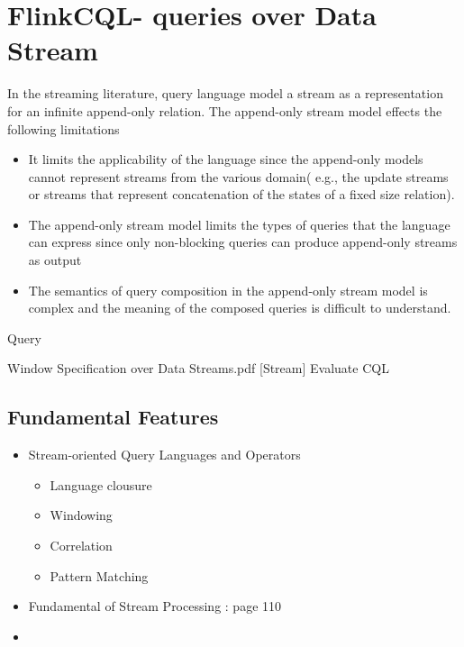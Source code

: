 
\chapter{FlinkCQL- queries over Data Stream}

\ifpdf
    \graphicspath{{Chapter4/Figs/Raster/}{Chapter4/Figs/PDF/}{Chapter4/Figs/}}
\else
    \graphicspath{{Chapter4/Figs/Vector/}{Chapter4/Figs/}}
\fi

In the streaming literature, query language model a stream as a representation for an infinite append-only relation. The append-only stream model effects the following limitations\citep{Ghanem:2008}
\begin{itemize}
\item It limits the applicability of the language since the append-only models cannot represent streams from the various domain( e.g., the update streams or streams that represent concatenation of the states of a fixed size relation).
\item The append-only stream model limits the types of queries that the language can express since only non-blocking queries can produce append-only streams as output
\item The semantics of query composition in the append-only stream model is complex and the meaning of the composed queries is difficult to understand.
\end{itemize}

Query \citep{Babcock:2002} 

Window Specification over Data Streams.pdf
[Stream] Evaluate CQL


\section{Fundamental Features}

\begin{itemize}
\item Stream-oriented Query Languages and Operators
	\begin{itemize}
		\item Language clousure
		\item Windowing
		\item Correlation
		\item Pattern Matching
	\end{itemize}
	
\item Fundamental of Stream Processing : page 110
\item 
\end{itemize}

